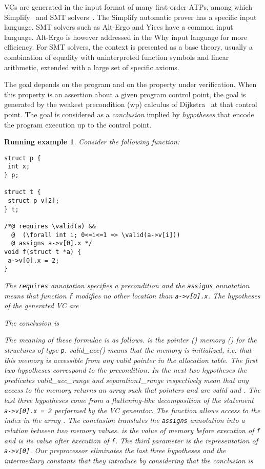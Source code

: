 \documentclass{acm_proc_article-sp}
\theoremstyle{nonumberplain}
\newtheorem{xpl}{Running example}}
\newcommand{\valid}[0]{\ensuremath{\mathsf{valid}}}
\begin{document}
VCs are generated in the input format of many first-order ATPs, among
which Simplify~\cite{simplify05} and SMT solvers~\cite{dMDS07}. The
Simplify automatic prover has a specific input language. SMT solvers
such as Alt-Ergo and Yices have a common input language. Alt-Ergo is
however addressed in the Why input language for more efficiency. For
SMT solvers, the context is presented as a base theory, usually a
combination of equality with uninterpreted function symbols and linear
arithmetic, extended with a large set of specific axioms.



The goal depends on the program and on the property under verification.
When this property is an assertion about a given program control point,
the goal is generated by the weakest precondition (wp) calculus of
Dijkstra~\cite{Dijkstra76} at that control point. The goal is
considered as a \emph{conclusion} implied by \emph{hypotheses} that
encode the program execution up to the control point.


\begin{xpl}
Consider the following function:
\begin{verbatim}
struct p {
 int x;
} p;

struct t {
 struct p v[2];	 
} t;

/*@ requires \valid(a) &&
  @  (\forall int i; 0<=i<=1 => \valid(a->v[i]))
  @ assigns a->v[0].x */
void f(struct t *a) {
 a->v[0].x = 2;
}
\end{verbatim}
The \texttt{requires} annotation specifies a
precondition and the \texttt{assigns} annotation means that function
\texttt{f} modifies no other location than \verb+a->v[0].x+.
The hypotheses of the generated VC are

The conclusion is

The meaning of these formulae is as follows.  is the
pointer () memory () for the structures of type \texttt{p}.
\textsf{valid\_\-acc}() means that the memory  is initialized,
i.e. that this memory is accessible from any valid pointer in the
allocation table. The first two hypotheses correspond to the
precondition. In the next two hypotheses the predi\-cates
\textsf{valid\_acc\_range} and
\textsf{separation1}\_\textsf{range} respectively mean that
any access to the memory  returns an array  such that
poin\-ters  and  are valid and .  The last
three hypotheses come from a flattening-like decomposition of the
statement \texttt{a->v[0].x = 2} performed by the VC generator. The
function  allows access to the index  in the
array . The conclusion translates the \texttt{assigns} annotation
into a relation between two memory values.  is the value of memory
 before execution of \verb+f+ and  is its value after
execution of \verb+f+. The third parameter is the representation of
\texttt{a->v[0]}. Our preprocessor eliminates the last
three hypotheses and the intermediary constants that they introduce by
considering that the conclusion is

\end{xpl}
\end{document}
